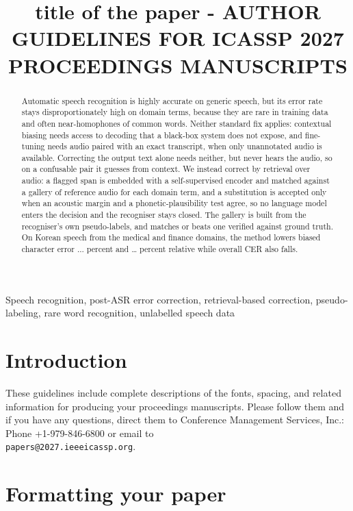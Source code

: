 \documentclass{article}
\title{title of the paper - AUTHOR GUIDELINES FOR ICASSP 2027 PROCEEDINGS MANUSCRIPTS}
\begin{document}
%
\maketitle
%
\begin{abstract}
Automatic speech recognition is highly accurate on generic speech, but its error rate stays disproportionately high on domain terms, because they are rare in training data and often near-homophones of common words. Neither standard fix applies: contextual biasing needs access to decoding that a black-box system does not expose, and fine-tuning needs audio paired with an exact transcript, when only unannotated audio is available. Correcting the output text alone needs neither, but never hears the audio, so on a confusable pair it guesses from context. We instead correct by retrieval over audio: a flagged span is embedded with a self-supervised encoder and matched against a gallery of reference audio for each domain term, and a substitution is accepted only when an acoustic margin and a phonetic-plausibility test agree, so no language model enters the decision and the recogniser stays closed. The gallery is built from the recogniser's own pseudo-labels, and matches or beats one verified against ground truth. On Korean speech from the medical and finance domains, the method lowers biased character error ... percent and … percent relative while overall CER also falls.				
\end{abstract}
%
\begin{keywords}
Speech recognition, post-ASR error correction, retrieval-based correction, pseudo-labeling, rare word recognition, unlabelled speech data
\end{keywords}
%
\section{Introduction}
\label{sec:intro}

These guidelines include complete descriptions of the fonts, spacing, and
related information for producing your proceedings manuscripts. Please follow
them and if you have any questions, direct them to Conference Management
Services, Inc.: Phone +1-979-846-6800 or email
to \\\texttt{papers@2027.ieeeicassp.org}.

\section{Formatting your paper}
\label{sec:format}
\end{document}
